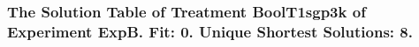  \begin{frame}
 \fontsize{8pt}{9pt}\selectfont
 \frametitle{ The Solution Table of Treatment BoolT1sgp3k of Experiment ExpB. Fit: 0. Unique Shortest Solutions: 8. }

 \label{ExpBSolutionTable006.tex}  
 \end{frame}

